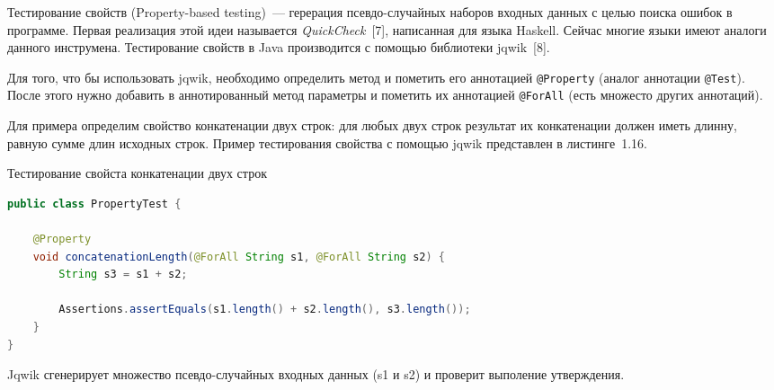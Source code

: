 Тестирование свойств (Property-based testing)~--- герерация псевдо-случайных наборов входных данных с целью поиска ошибок в программе. Первая реализация этой идеи называется \textit{QuickCheck}~[7], написанная для языка Haskell. Сейчас многие языки имеют аналоги данного инструмена. Тестирование свойств в Java производится с помощью библиотеки jqwik~[8].

Для того, что бы использовать jqwik, необходимо определить метод и пометить его аннотацией \texttt{@Property} (аналог аннотации \texttt{@Test}). После этого нужно добавить в аннотированный метод параметры и пометить их аннотацией \texttt{@ForAll} (есть множесто других аннотаций). 

Для примера определим свойство конкатенации двух строк: для любых двух строк результат их конкатенации должен иметь длинну, равную сумме длин исходных строк. Пример тестирования свойства с помощью jqwik представлен в листинге~1.16.

\begin{ListingEnv}[!h]%
	\captiondelim{ } %
	\caption{Тестирование свойста конкатенации двух строк}
	\begin{lstlisting}[language={Java}]
public class PropertyTest {
	
	@Property
	void concatenationLength(@ForAll String s1, @ForAll String s2) {
		String s3 = s1 + s2;
		
		Assertions.assertEquals(s1.length() + s2.length(), s3.length());
	}
}
	\end{lstlisting}
\end{ListingEnv}%

Jqwik сгенерирует множество псевдо-случайных входных данных (s1 и s2) и проверит выполение утверждения.
